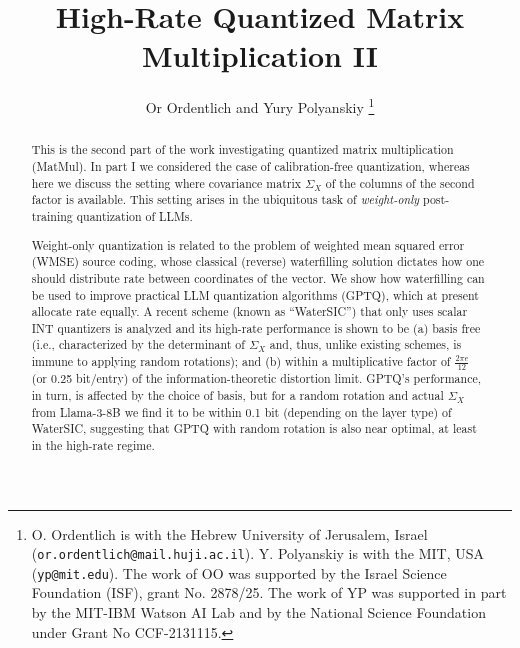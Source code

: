 \documentclass[journal]{IEEEtran}
\begin{document}
\title{High-Rate Quantized Matrix Multiplication II}

\author{Or Ordentlich %
and	Yury Polyanskiy %
\thanks{O. Ordentlich is with the %
Hebrew University of Jerusalem, Israel (\texttt{or.ordentlich@mail.huji.ac.il}).  Y. Polyanskiy is with the MIT,
USA (\texttt{yp@mit.edu}). The work of OO was supported by the Israel Science 
Foundation (ISF),
grant No. 2878/25. The work of YP was supported in part by the MIT-IBM Watson AI Lab and by the National Science
    Foundation under Grant No CCF-2131115. }
}


\date{}

\maketitle
\begin{abstract}
This is the second part of the work investigating quantized matrix multiplication (MatMul). 
In part I we considered the case of calibration-free quantization, whereas here we discuss the
setting where covariance matrix $\Sigma_X$ of the columns of the second factor is available. This
setting arises in the ubiquitous task of \textit{weight-only} post-training quantization of LLMs.
 
Weight-only quantization is related to the problem of weighted mean squared error (WMSE) source
coding, whose classical (reverse) waterfilling solution dictates how one should distribute rate
between coordinates of the vector. We show how waterfilling can be used to improve practical LLM
quantization algorithms (GPTQ), which at present allocate rate equally. A recent scheme (known as ``WaterSIC'') 
that only uses scalar INT quantizers is analyzed and its high-rate
performance is shown to be (a) basis free (i.e., characterized by the determinant of $\Sigma_X$ and, thus, unlike existing
schemes, is immune to applying random rotations);  and (b)  within a multiplicative
factor of $\frac{2\pi e}{12}$ (or 0.25 bit/entry) of the information-theoretic 
distortion limit. GPTQ's performance, in turn, is affected by the choice of basis, but for a random
rotation and actual $\Sigma_X$ from Llama-3-8B we find
it to be within 0.1 bit (depending on the layer type) of WaterSIC, suggesting that GPTQ with
random rotation is also near optimal, at least in the high-rate regime. 
\end{abstract}

\end{document}
